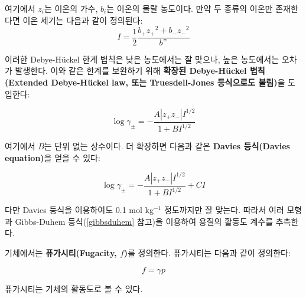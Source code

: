         여기에서 $z_i$는 이온의 가수, $b_i$는 이온의 몰랄 농도이다. 만약 두 종류의 이온만 존재한다면 이온 세기는 다음과 같이 정의된다:
        \begin{equation*}
            I = \frac{1}{2}\frac{b_{+}{z_{+}}^2+b_{-}{z_{-}}^2}{b^\circlehbar}
        \end{equation*}
        \par 이러한 Debye-Hückel 한계 법칙은 낮은 농도에서는 잘 맞으나, 높은 농도에서는 오차가 발생한다. 이와 같은 
        한계를 보완하기 위해 \textbf{확장된 Debye-Hückel 법칙(Extended Debye-Hückel law, 또는 Truesdell-Jones 등식으로도 불림)}을 도입한다:
        \begin{law}
        \begin{equation*}
            \log{\gamma_\pm}=-\frac{A \left\vert z_{+}z_{-}\right\vert I^{1/2}}{1+BI^{1/2}}
        \end{equation*}
        \end{law}
        여기에서 $B$는 단위 없는 상수이다. 더 확장하면 다음과 같은 \textbf{Davies 등식(Davies equation)}을 얻을 수 있다:
        \begin{law}[Davies 등식]
        \begin{equation*}
            \log{\gamma_\pm}=-\frac{A \left\vert z_{+}z_{-}\right\vert I^{1/2}}{1+BI^{1/2}}+CI
        \end{equation*}
        \end{law}
        다만 Davies 등식을 이용하여도 0.1 mol kg$^{-1}$ 정도까지만 잘 맞는다. 따라서 여러 모형과 Gibbs-Duhem 등식(\ref{gibbsduhem} 참고)을 
        이용하여 용질의 활동도 계수를 추측한다. 
        \par 기체에서는 \textbf{퓨가시티(Fugacity, $f$)}를 정의한다. 퓨가시티는 다음과 같이 정의한다:
        \begin{defn}[퓨가시티]
        \begin{equation*}
            f=\gamma p
        \end{equation*}
        \end{defn}
        퓨가시티는 기체의 활동도로 볼 수 있다.